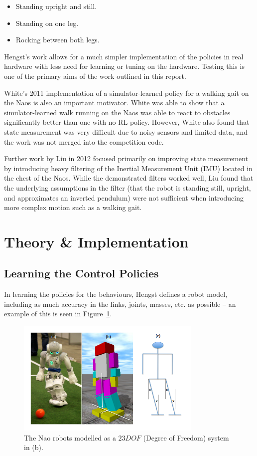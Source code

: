 \begin{itemize}
\item Standing upright and still.
\item Standing on one leg.
\item Rocking between both legs.
\end{itemize}

Hengst's work allows for a much simpler implementation of the policies in real hardware with less need for learning or tuning on the hardware. Testing this is one of the primary aims of the work outlined in this report.

White's\cite{white} 2011 implementation of a simulator-learned policy for a walking gait on the Naos is also an important motivator. White was able to show that a simulator-learned walk running on the Naos was able to react to obstacles significantly better than one with no RL policy. However, White also found that state measurement was very difficult due to noisy sensors and limited data, and the work was not merged into the competition code.

Further work by Liu\cite{liu} in 2012 focused primarily on improving state measurement by introducing heavy filtering of the Inertial Measurement Unit (IMU) located in the chest of the Naos. While the demonstrated filters worked well, Liu found that the underlying assumptions in the filter (that the robot is standing still, upright, and approximates an inverted pendulum) were not sufficient when introducing more complex motion such as a walking gait.

\section{Theory \& Implementation}

\subsection{Learning the Control Policies}
In learning the policies for the behaviours, Hengst\cite{bernhard_rl} defines a robot model, including as much accuracy in the links, joints, masses, etc. as possible -- an example of this is seen in Figure~\ref{fig:lean}.

\begin{figure}[h]
\centering
\includegraphics[width=3.5in]{img/RL_lean.png}
\caption{The Nao robots modelled as a $23 DOF$ (Degree of Freedom) system in (b). \cite{bernhard_rl}}
\label{fig:lean}
\end{figure}

